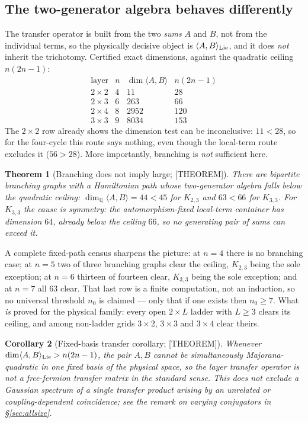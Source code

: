 \documentclass[11pt]{article}
\newtheorem{theorem}{Theorem}[section]
\newtheorem{corollary}[theorem]{Corollary}
\theoremstyle{definition}
\newcommand{\Qb}{\mathbb{Q}}
\begin{document}
\subsection{The two-generator algebra behaves differently}\label{sec:twogen}
The transfer operator is built from the two \emph{sums} $A$ and $B$, not from the individual terms,
so the physically decisive object is $\langle A,B\rangle_{\rm Lie}$, and it does \emph{not} inherit
the trichotomy. Certified exact dimensions, against the quadratic ceiling $n(2n-1)$:
\[
\begin{array}{l|c|r|r}
\text{layer} & n & \dim\langle A,B\rangle & n(2n-1)\\ \hline
2\times2 & 4 & 11 & 28\\
2\times3 & 6 & 263 & 66\\
2\times4 & 8 & 2952 & 120\\
3\times3 & 9 & 8034 & 153
\end{array}
\]
The $2\times2$ row already shows the dimension test can be inconclusive: $11<28$, so for the
four-cycle this route says nothing, even though the local-term route excludes it
($56>28$). More importantly, branching is \emph{not} sufficient here.

\begin{theorem}[Branching does not imply large; {[THEOREM]}]\label{thm:kcounter}
There are bipartite branching graphs with a Hamiltonian path whose two-generator algebra falls below
the quadratic ceiling: $\dim_\Qb\langle A,B\rangle=44<45$ for $K_{2,3}$ and $63<66$ for $K_{3,3}$.
For $K_{3,3}$ the cause is symmetry: the automorphism-fixed local-term container has dimension $64$,
already below the ceiling $66$, so no generating pair of sums can exceed it.
\end{theorem}

A complete fixed-path census sharpens the picture: at $n=4$ there is no branching case; at $n=5$
two of three branching graphs clear the ceiling, $K_{2,3}$ being the sole exception; at $n=6$
thirteen of fourteen clear, $K_{3,3}$ being the sole exception; and at $n=7$ all $63$ clear. That last
row is a finite computation, not an induction, so no universal threshold $n_0$ is claimed --- only
that if one exists then $n_0\ge7$. What \emph{is} proved for the physical family: every open
$2\times L$ ladder with $L\ge3$ clears its ceiling, and among non-ladder grids $3\times2$,
$3\times3$ and $3\times4$ clear theirs.

\begin{corollary}[Fixed-basis transfer corollary; {[THEOREM]}]
Whenever $\dim\langle A,B\rangle_{\rm Lie}>n(2n-1)$, the pair $A,B$ cannot be simultaneously
Majorana-quadratic in one fixed basis of the physical space, so the layer transfer operator is not a
free-fermion transfer matrix in the standard sense. This does \emph{not} exclude a Gaussian spectrum
of a single transfer product arising by an unrelated or coupling-dependent coincidence; see the
remark on varying conjugators in \S\ref{sec:allsize}.
\end{corollary}
\end{document}
